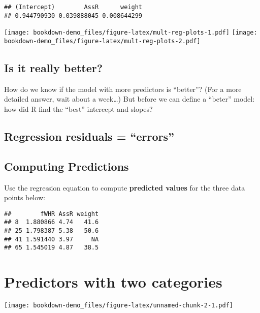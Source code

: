 \documentclass[]{book}
\begin{document}
\begin{verbatim}
## (Intercept)        AssR      weight 
## 0.944790930 0.039888045 0.008644299
\end{verbatim}

\texttt{[image: bookdown-demo\_files/figure-latex/mult-reg-plots-1.pdf]} \texttt{[image: bookdown-demo\_files/figure-latex/mult-reg-plots-2.pdf]}

\hypertarget{is-it-really-better}{%
\subsection{Is it really better?}\label{is-it-really-better}}

How do we know if the model with more predictors is ``better''? (For a more detailed answer, wait about a week\ldots{}) But before we can define a ``beter'' model: how did R find the ``best'' intercept and slopes?

\hypertarget{regression-residuals-errors}{%
\subsection{Regression residuals = ``errors''}\label{regression-residuals-errors}}

\vspace{1.25in}

\hypertarget{computing-predictions}{%
\subsection{Computing Predictions}\label{computing-predictions}}

Use the regression equation to compute \textbf{predicted values} for the three data points below:

\begin{verbatim}
##        fWHR AssR weight
## 8  1.880866 4.74   41.6
## 25 1.798387 5.38   50.6
## 41 1.591440 3.97     NA
## 65 1.545019 4.87   38.5
\end{verbatim}

\vspace{2in}

\hypertarget{predictors-with-two-categories}{%
\section{Predictors with two categories}\label{predictors-with-two-categories}}

\texttt{[image: bookdown-demo\_files/figure-latex/unnamed-chunk-2-1.pdf]}
\end{document}
